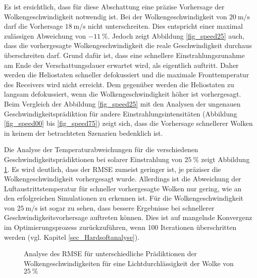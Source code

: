 Es ist ersichtlich, dass für diese Abschattung eine präzise Vorhersage der Wolkengeschwindigkeit notwendig ist.
Bei der Wolkengeschwindigkeit von $\SI{20}{\metre\per\second}$ darf die Vorhersage $\SI{18}{\metre\per\second}$ nicht unterschreiten.
Dies entspricht einer maximal zulässigen Abweichung von $\SI{-11}{\percent}$.
Jedoch zeigt Abbildung \ref{fig_speed25} auch, dass die vorhergesagte Wolkengeschwindigkeit die reale Geschwindigkeit durchaus überschreiten darf.
Grund dafür ist, dass eine schnellere Einstrahlungszunahme am Ende der Verschattungsdauer erwartet wird, als eigentlich auftritt.
Daher werden die Heliostaten schneller defokussiert und die maximale Fronttemperatur des Receivers wird nicht erreicht.
Dem gegenüber werden die Heliostaten zu langsam defokussiert, wenn die Wolkengeschwindigkeit höher ist vorhergesagt.
Beim Vergleich der Abbildung \ref{fig_speed25} mit den Analysen der ungenauen Geschwindigkeitsprädiktion für andere Einstrahlungsintensitäten (Abbildung \ref{fig_speed00} bis \ref{fig_speed75}) zeigt sich, dass die Vorhersage schnellerer Wolken in keinem der betrachteten Szenarien bedenklich ist.

Die Analyse der Temperaturabweichungen für die verschiedenen Geschwindigkeitsprädiktionen bei solarer Einstrahlung von $\SI{25}{\percent}$ zeigt Abbildung \ref{fig_speed25RMSE}.
Es wird deutlich, dass der RMSE zumeist geringer ist, je präziser die Wolkengeschwindigkeit vorhergesagt wurde.
Allerdings ist die Abweichung der Luftaustrittstemperatur für schneller vorhergesagte Wolken nur gering, wie an den erfolgreichen Simulationen zu erkennen ist.
Für die Wolkengeschwindigkeit von $\SI{25}{\metre\per\second}$ ist sogar zu sehen, dass bessere Ergebnisse bei schnellerer Geschwindigkeitsvorhersage auftreten können.
Dies ist auf mangelnde Konvergenz im Optimierungsprozess zurückzuführen, wenn 100 Iterationen überschritten werden (vgl. Kapitel \ref{sec_Hardsoftanalyse}).

\begin{figure}[h!]
    \centering
    \setlength{\fboxsep}{1pt}
    \setlength{\fboxrule}{1pt}
    \caption[Analyse des RMSE für unterschiedliche Prädiktionen der Wolkengeschwindigkeiten für eine Lichtdurchlässigkeit der Wolke von $\SI{25}{\percent}$]{Analyse des RMSE für unterschiedliche Prädiktionen der Wolkengeschwindigkeiten für eine Lichtdurchlässigkeit der Wolke von $\SI{25}{\percent}$}
    \label{fig_speed25RMSE}
\end{figure}

